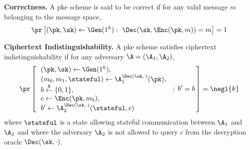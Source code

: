 \begin{description}
\item \textbf{Correctness.} A \gls{pke} scheme is said to be correct if for any valid message $m$ belonging to the message space,
\begin{equation*}
    \pr\left[(\pk,\sk) \gets \Gen(1^k): ~ \Dec(\sk,\Enc(\pk,m))=m\right]=1
\end{equation*}

\item \textbf{Ciphertext Indistinguishability.} A \gls{pke} scheme satisfies ciphertext indistinguishability if for any \ppt adversary $\A=(\A_1,\A_2)$,
  \begin{equation*}
      \pr\left[\, \begin{array}{l}
          (\pk,\sk) \gets \Gen(1^k),\\
          (m_0,m_1,\stateful) \gets \A_1^{\Dec(\sk,\cdot)}(\pk),\\
          b \overset{\$}{\leftarrow} \{0,1\},\\
          c \gets \Enc(\pk,m_b),\\
          b' \gets \A_2^{\Dec(\sk,\cdot)}(\stateful,c)
        \end{array}\,: \,b'=b \,\right] = \negl{k}
  \end{equation*}
  where $\stateful$ is a state allowing stateful communication between $\A_1$ and $\A_2$ and where the adversary $\A_2$ is not allowed to query $c$ from the decryption oracle $\Dec(\sk,\cdot)$.
\end{description}

